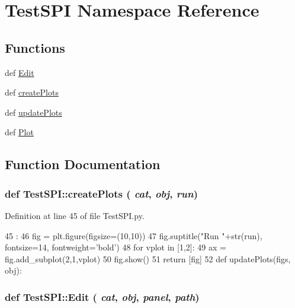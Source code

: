 \hypertarget{namespaceTestSPI}{
\section{TestSPI Namespace Reference}
\label{namespaceTestSPI}
}
\subsection*{Functions}
\begin{DoxyCompactItemize}
\item 
def \hyperlink{namespaceTestSPI_ab75f8521928b5bb20dfb02b2fe8820d4}{Edit}
\item 
def \hyperlink{namespaceTestSPI_a30bc048fd0f31200f3a9bd9751139552}{createPlots}
\item 
def \hyperlink{namespaceTestSPI_af2d9c99fbaf7eb8abe974ea72714a904}{updatePlots}
\item 
def \hyperlink{namespaceTestSPI_aeae7bd62487a521487e2c5a3a1c3a6e7}{Plot}
\end{DoxyCompactItemize}


\subsection{Function Documentation}
\hypertarget{namespaceTestSPI_a30bc048fd0f31200f3a9bd9751139552}{
\subsubsection[{createPlots}]{\setlength{\rightskip}{0pt plus 5cm}def TestSPI::createPlots ( {\em cat}, \/   {\em obj}, \/   {\em run})}}
\label{namespaceTestSPI_a30bc048fd0f31200f3a9bd9751139552}


Definition at line 45 of file TestSPI.py.


\begin{DoxyCode}
45                               :
46     fig = plt.figure(figsize=(10,10))
47     fig.suptitle("Run "+str(run), fontsize=14, fontweight='bold')
48     for vplot in [1,2]:
49         ax = fig.add_subplot(2,1,vplot)
50     fig.show()    
51     return [fig]
52 
def updatePlots(figs, obj):
\end{DoxyCode}
\hypertarget{namespaceTestSPI_ab75f8521928b5bb20dfb02b2fe8820d4}{
\subsubsection[{Edit}]{\setlength{\rightskip}{0pt plus 5cm}def TestSPI::Edit ( {\em cat}, \/   {\em obj}, \/   {\em panel}, \/   {\em path})}}
\label{namespaceTestSPI_ab75f8521928b5bb20dfb02b2fe8820d4}


